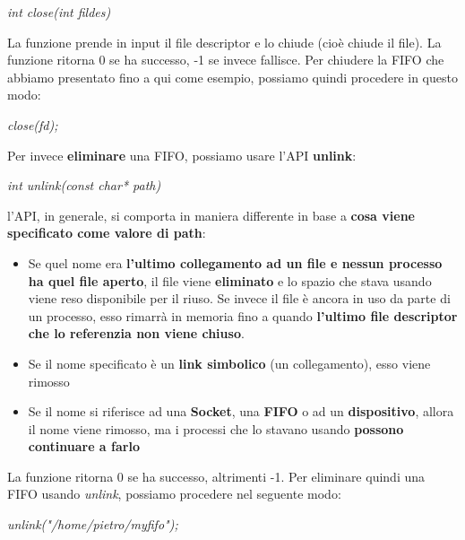\documentclass[12pt]{article}
\begin{document}
\begin{center}
    \textit{int close(int fildes)}
\end{center}
La funzione prende in input il file descriptor e lo chiude (cioè chiude il file).
La funzione ritorna 0 se ha successo, -1 se invece fallisce. Per chiudere la FIFO che abbiamo presentato fino a qui come esempio,
possiamo quindi procedere in questo modo:
\begin{center}
    \textit{close(fd);}
\end{center}
Per invece \textbf{eliminare} una FIFO, possiamo usare l'API \textbf{unlink}:
\begin{center}
    \textit{int unlink(const char* path)}
\end{center}
l'API, in generale, si comporta in maniera differente in base a \textbf{cosa viene specificato come valore di path}:
\begin{itemize}
    \item Se quel nome era \textbf{l'ultimo collegamento ad un file e nessun processo ha quel file aperto}, il file viene \textbf{eliminato} e lo spazio che stava usando viene reso disponibile per il riuso.
    Se invece il file è ancora in uso da parte di un processo, esso rimarrà in memoria fino a quando \textbf{l'ultimo file descriptor che lo referenzia non viene chiuso}.
    \item Se il nome specificato è un \textbf{link simbolico} (un collegamento), esso viene rimosso
    \item Se il nome si riferisce ad una \textbf{Socket}, una \textbf{FIFO} o ad un \textbf{dispositivo}, allora il nome viene rimosso, ma i processi che lo stavano usando \textbf{possono continuare a farlo}
\end{itemize} 
La funzione ritorna 0 se ha successo, altrimenti -1. Per eliminare quindi una FIFO usando \textit{unlink}, possiamo procedere nel seguente modo:
\begin{center}
    \textit{unlink("/home/pietro/myfifo");}
\end{center}
\end{document}
